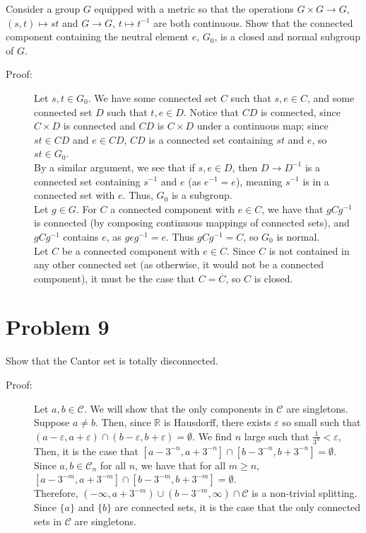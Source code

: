 \documentclass[10pt]{extarticle}
\newcommand{\R}{\mathbb{R}}
\begin{document}
  Consider a group $G$ equipped with a metric so that the operations $G\times G \rightarrow G$, $(s,t)\mapsto st$ and $G\rightarrow G$, $t\mapsto t^{-1}$ are both continuous. Show that the connected component containing the neutral element $e$, $G_0$, is a closed and normal subgroup of $G$.
  \begin{description}
    \item[Proof:] Let $s,t\in G_0$. We have some connected set $C$ such that $s,e\in C$, and some connected set $D$ such that $t,e\in D$. Notice that $CD$ is connected, since $C\times D$ is connected and $CD$ is $C\times D$ under a continuous map; since $st\in CD$ and $e\in CD$, $CD$ is a connected set containing $st$ and $e$, so $st\in G_0$.\\

      By a similar argument, we see that if $s,e\in D$, then $D\rightarrow D^{-1}$ is a connected set containing $s^{-1}$ and $e$ (as $e^{-1} = e$), meaning $s^{-1}$ is in a connected set with $e$. Thus, $G_0$ is a subgroup.\\

      Let $g\in G$. For $C$ a connected component with $e\in C$, we have that $gCg^{-1}$ is connected (by composing continuous mappings of connected sets), and $gCg^{-1}$ contains $e$, as $geg^{-1} = e$. Thus $gCg^{-1} = C$, so $G_0$ is normal.\\

      Let $C$ be a connected component with $e\in C$. Since $C$ is not contained in any other connected set (as otherwise, it would not be a connected component), it must be the case that $C = \overline{C}$, so $C$ is closed.
  \end{description}
  \section{Problem 9}%
  Show that the Cantor set is totally disconnected.
  \begin{description}
    \item[Proof:] Let $a,b\in \mathcal{C}$. We will show that the only components in $\mathcal{C}$ are singletons.\\

      Suppose $a\neq b$. Then, since $\R$ is Hausdorff, there exists $\varepsilon$ so small such that $(a-\varepsilon,a+\varepsilon) \cap (b-\varepsilon,b+\varepsilon) = \emptyset$. We find $n$ large such that $\frac{1}{3^n} < \varepsilon$, Then, it is the case that $[a-3^{-n},a+3^{-n}] \cap [b-3^{-n},b+3^{-n}] = \emptyset$.\\

      Since $a,b\in \mathcal{C}_n$ for all $n$, we have that for all $m\geq n$, $[a-3^{-m},a+3^{-m}] \cap [b-3^{-m},b+3^{-m}] = \emptyset$.\\

      Therefore, $(-\infty,a+3^{-m}) \cup (b-3^{-m},\infty)\cap \mathcal{C}$ is a non-trivial splitting.\\

      Since $\{a\}$ and $\{b\}$ are connected sets, it is the case that the only connected sets in $\mathcal{C}$ are singletons.
  \end{description}
\end{document}
